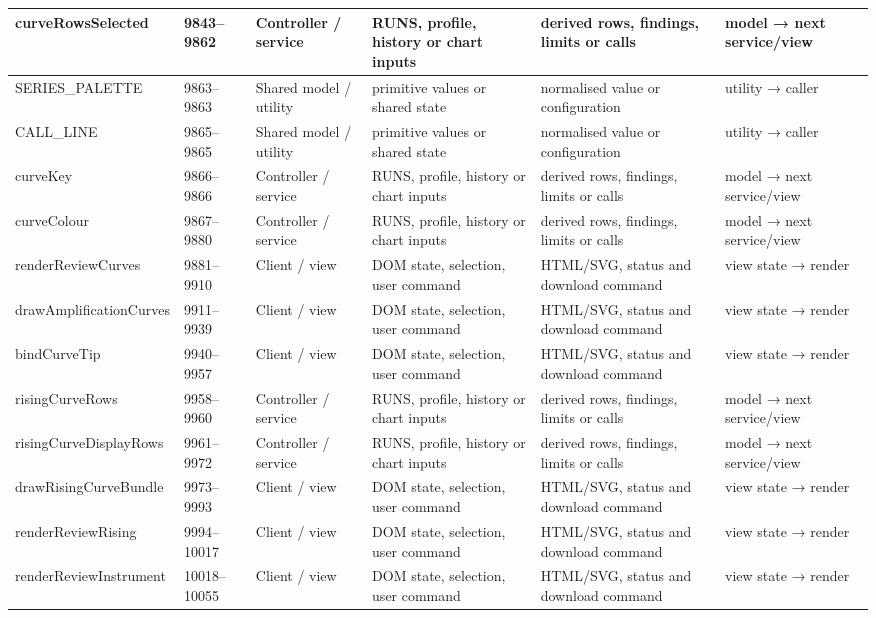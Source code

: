 \begin{landscape}
\begin{longtable}{@{}p{3.2cm}p{1.45cm}p{2.7cm}p{4.0cm}p{4.0cm}p{3.0cm}@{}}
curveRowsSelected & 9843--9862 & Controller / service & RUNS, profile, history or chart inputs & derived rows, findings, limits or calls & model → next service/view \\\hline
SERIES\_PALETTE & 9863--9863 & Shared model / utility & primitive values or shared state & normalised value or configuration & utility → caller \\\hline
CALL\_LINE & 9865--9865 & Shared model / utility & primitive values or shared state & normalised value or configuration & utility → caller \\\hline
curveKey & 9866--9866 & Controller / service & RUNS, profile, history or chart inputs & derived rows, findings, limits or calls & model → next service/view \\\hline
curveColour & 9867--9880 & Controller / service & RUNS, profile, history or chart inputs & derived rows, findings, limits or calls & model → next service/view \\\hline
renderReviewCurves & 9881--9910 & Client / view & DOM state, selection, user command & HTML/SVG, status and download command & view state → render \\\hline
drawAmplificationCurves & 9911--9939 & Client / view & DOM state, selection, user command & HTML/SVG, status and download command & view state → render \\\hline
bindCurveTip & 9940--9957 & Client / view & DOM state, selection, user command & HTML/SVG, status and download command & view state → render \\\hline
risingCurveRows & 9958--9960 & Controller / service & RUNS, profile, history or chart inputs & derived rows, findings, limits or calls & model → next service/view \\\hline
risingCurveDisplayRows & 9961--9972 & Controller / service & RUNS, profile, history or chart inputs & derived rows, findings, limits or calls & model → next service/view \\\hline
drawRisingCurveBundle & 9973--9993 & Client / view & DOM state, selection, user command & HTML/SVG, status and download command & view state → render \\\hline
renderReviewRising & 9994--10017 & Client / view & DOM state, selection, user command & HTML/SVG, status and download command & view state → render \\\hline
renderReviewInstrument & 10018--10055 & Client / view & DOM state, selection, user command & HTML/SVG, status and download command & view state → render \\\hline

\end{longtable}
\end{landscape}
